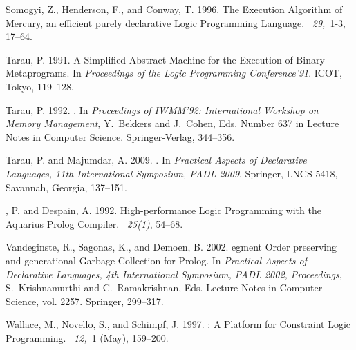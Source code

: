 \documentclass{tlp}
\begin{document}
\begin{thebibliography}{}
{\sc Somogyi, Z.}, {\sc Henderson, F.}, {\sc and} {\sc Conway, T.} 1996.
\newblock The {E}xecution {A}lgorithm of {M}ercury, an efficient purely
  declarative {L}ogic {P}rogramming {L}anguage.
~{\em 29,\/}~1-3, 17--64.

{\sc Tarau, P.} 1991.
\newblock A {S}implified {A}bstract {M}achine for the {E}xecution of {B}inary
  {M}etaprograms.
\newblock In {\em Proceedings of the Logic Programming Conference'91}. ICOT,
  Tokyo, 119--128.

{\sc Tarau, P.} 1992.
.
\newblock In {\em Proceedings of IWMM'92: International Workshop on Memory
  Management}, {Y.~Bekkers} {and} {J.~Cohen}, Eds. Number 637 in Lecture Notes
  in Computer Science. Springer-Verlag, 344--356.

{\sc Tarau, P.} {\sc and} {\sc Majumdar, A.} 2009.
.
\newblock In {\em {Practical Aspects of Declarative Languages, 11th
  International Symposium, PADL 2009}}. Springer, LNCS 5418, Savannah, Georgia,
  137--151.

{, P.} {\sc and} {\sc Despain, A.} 1992.
\newblock High-performance {L}ogic {P}rogramming with the {A}quarius {P}rolog
  {C}ompiler.
~{\em 25(1)}, 54--68.

{\sc Vandeginste, R.}, {\sc Sagonas, K.}, {\sc and} {\sc Demoen, B.} 2002.
egment {O}rder preserving and generational {G}arbage {C}ollection
  for {P}rolog.
\newblock In {\em Practical Aspects of Declarative Languages, 4th International
  Symposium, PADL 2002, Proceedings}, {S.~Krishnamurthi} {and}
  {C.~Ramakrishnan}, Eds. Lecture Notes in Computer Science, vol. 2257.
  Springer, 299--317.

{\sc Wallace, M.}, {\sc Novello, S.}, {\sc and} {\sc Schimpf, J.} 1997.
: A {P}latform for {C}onstraint {L}ogic {P}rogramming.
~{\em 12,\/}~1 (May), 159--­200.


\end{thebibliography}
\end{document}
